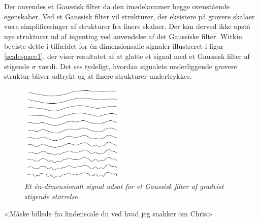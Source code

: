 Der anvendes et Gaussisk filter da den imødekommer begge ovenstående egenskaber. Ved et Gaussisk filter vil strukturer, der eksistere på grovere skalaer være simplificeringer af strukturer fra finere skalaer. Der kan derved ikke opstå nye strukturer ud af ingenting ved anvendelse af det Gaussiske filter. Witkin \cite{witkins} beviste dette i tilfældet for én-dimensionsalle signaler illustreret i figur \ref{scalespace1}, der viser resultatet af at glatte et signal med et Gaussisk filter af stigende $\sigma$ værdi. Det ses tydeligt, hvordan signalets underliggende grovere struktur bliver udtrykt og at finere strukturer undertrykkes.
\begin{figure}[H]
    \centering
    \includegraphics[width=0.45\textwidth]{fig/33.png}
     \vspace{-1em}
    \begin{center}    
       \caption{{\footnotesize \textit{Et én-dimensionalt signal udsat for et Gaussisk filter af gradvist stigende størrelse.}}}
    \label{fig:scalereps}
     \end{center}
     \vspace{-2.5em}
  \end{figure} \noindent
<Måske billede fra lindenscale du ved hvad jeg snakker om Chris>
